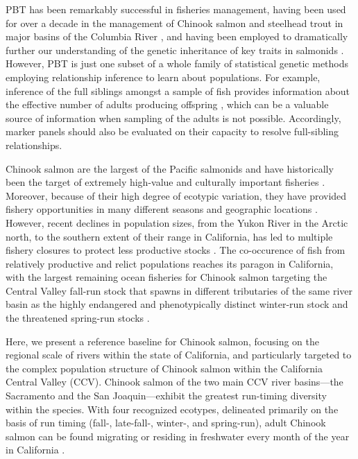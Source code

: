 PBT has been remarkably successful in fisheries
management, having been used for over a decade in the management of Chinook salmon
and steelhead trout in major basins of the Columbia River \citep{steele2019parentage,horn2023multigeneration}, and having been employed to dramatically further our
understanding of the genetic inheritance of key traits in salmonids
\citep{abadia2013large,beulke2023distinct}. However, PBT is just one subset of a whole
family of statistical genetic methods employing relationship inference to learn about
populations.  For example, inference of the full siblings amongst a sample of fish
provides information about the effective number of adults producing offspring
\citep{waples2011inbreeding,wang2023estimating}, which can
be a valuable source of information when sampling of the adults is not possible.
Accordingly, marker panels should also be evaluated on their
capacity to resolve full-sibling relationships.

Chinook salmon are the largest of the Pacific salmonids and have historically been the target of extremely high-value and culturally important
fisheries \citep{myers1998status}. Moreover, because of their high degree of ecotypic variation, they have provided fishery opportunities in many
different seasons and geographic locations \citep{healey1991life}. However, recent declines in population sizes, from the Yukon River in the Arctic north,
to the southern extent of their range in California, has led to multiple fishery closures to protect
less productive stocks \citep{lindley2009caused}. The co-occurence of fish from relatively productive and relict populations reaches its paragon in California,
with the largest remaining ocean fisheries for Chinook salmon targeting the Central Valley fall-run stock that spawns in different tributaries of the
same river basin as the highly endangered and phenotypically distinct winter-run stock and the threatened spring-run stocks \citep{satterthwaite2015stock}.

Here, we present a reference baseline for Chinook salmon, focusing on the regional scale of
rivers within the state of California, and particularly targeted to the complex population
structure of Chinook salmon within the California Central Valley (CCV). Chinook salmon of the two main CCV river basins---the
Sacramento and the San Joaquin---exhibit the greatest run-timing diversity
within the species.  With four recognized ecotypes, delineated primarily on the basis of run timing
(fall-, late-fall-, winter-, and spring-run), adult Chinook salmon can be found migrating or residing
in freshwater every month of the year in California \citep{fisher1994past}.  


